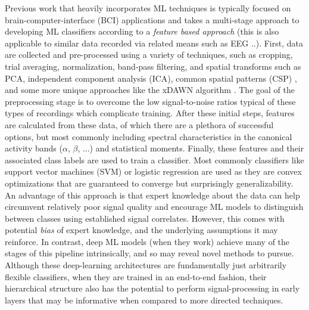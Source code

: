 \documentclass[utf8]{frontiersSCNS} %
\begin{document}
Previous work that heavily incorporates ML techniques is typically focused on brain-computer-interface (BCI) applications and takes a multi-stage approach to developing ML classifiers according to a \emph{feature based approach} (this is also applicable to similar data recorded via related means such as EEG ..). First, data are collected and pre-processed using a variety of techniques, such as cropping, trial averaging, normalization, band-pass filtering, and spatial transforms such as PCA, independent component analysis (ICA), common spatial patterns (CSP) \cite{Muller-Gerking1999}, and some more unique approaches like the xDAWN algorithm \cite{Rivet2009}. The goal of the preprocessing stage is to overcome the low signal-to-noise ratios typical of these types of recordings which complicate training. After these initial steps, features are calculated from these data, of which there are a plethora of successful options, but most commonly including spectral characteristics in the canonical activity bands ($\alpha$, $\beta$, ...) and statistical moments. Finally, these features and their associated class labels are used to train a classifier. Most commonly classifiers like support vector machines (SVM) or logistic regression are used as they are convex optimizations that are guaranteed to converge but surprisingly generalizability. An advantage of this approach is that expert knowledge about the data can help circumvent relatively poor signal quality and encourage ML models to distinguish between classes using established signal correlates. However, this comes with potential \emph{bias} of expert knowledge, and the underlying assumptions it may reinforce. In contrast, deep ML models (when they work) achieve many of the stages of this pipeline intrinsically, and so may reveal novel methods to pursue. Although these deep-learning architectures are fundamentally just arbitrarily flexible classifiers, when they are trained in an end-to-end fashion, their hierarchical structure also has the potential to perform signal-processing in early layers that may be informative when compared to more directed techniques.
\end{document}
